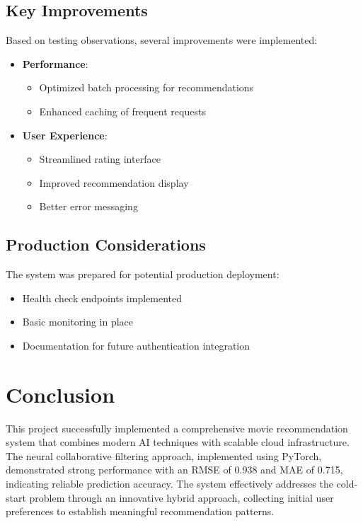 \documentclass[12pt]{article}
\begin{document}
\subsection{Key Improvements}
Based on testing observations, several improvements were implemented:

\begin{itemize}
    \item \textbf{Performance}:
    \begin{itemize}
        \item Optimized batch processing for recommendations
        \item Enhanced caching of frequent requests
    \end{itemize}
    
    \item \textbf{User Experience}:
    \begin{itemize}
        \item Streamlined rating interface
        \item Improved recommendation display
        \item Better error messaging
    \end{itemize}
\end{itemize}

\subsection{Production Considerations}
The system was prepared for potential production deployment:

\begin{itemize}
    \item Health check endpoints implemented
    \item Basic monitoring in place
    \item Documentation for future authentication integration
\end{itemize}

\section{Conclusion}
This project successfully implemented a comprehensive movie recommendation system that combines modern AI techniques with scalable cloud infrastructure. The neural collaborative filtering approach, implemented using PyTorch, demonstrated strong performance with an RMSE of 0.938 and MAE of 0.715, indicating reliable prediction accuracy. The system effectively addresses the cold-start problem through an innovative hybrid approach, collecting initial user preferences to establish meaningful recommendation patterns.
\end{document}
